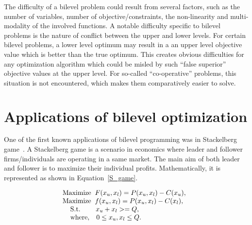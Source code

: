 The difficulty of a bilevel problem could result from several factors, such as the number of variables, number of objective/constraints, the non-linearity and multi-modality of the involved functions. A notable difficulty specific to bilevel problems is the nature of conflict between the upper and lower levels. For certain bilevel problems, a lower level optimum may result in a an upper level objective value which is better than the true optimum. This creates obvious difficulties for any optimization algorithm which could be misled by such ``false superior'' objective values at the upper level. For so-called ``co-operative'' problems, this situation is not encountered, which makes them comparatively easier to solve.  




\section{Applications of bilevel optimization}


One of the first known applications of bilevel programming was in Stackelberg game~\cite{candler1982linear}. A Stackelberg game is a scenario in economics where leader and follower firms/individuals are operating in a same market. The main aim of both leader and follower is to maximize their individual profits. Mathematically, it is represented as shown in Equation~\ref{S_game}.
	
		\begin{equation}
  \begin{array}{lr}
   \text{Maximize}\hspace{2mm} F(x_u, x_l)=P(x_u, x_l)-C(x_u), \hspace{2mm} \\
   \text{Maximize}\hspace{2mm} f(x_u, x_l)=P(x_u, x_l)-C(x_l), \hspace{2mm} \\
  \hspace{4mm}\text{S.t.}\hspace{8mm} x_u+x_l>=Q,\\
	\hspace{4mm} \text{where},\hspace{3mm}  0 \leq x_u,x_l \leq Q.\\
  \end{array}
  \label{S_game}
  \end{equation}
	
